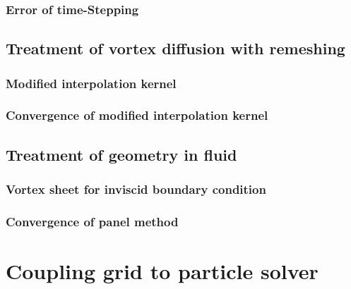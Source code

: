 \subsubsection{Error of time-Stepping}

\subsection{Treatment of vortex diffusion with remeshing}


\subsubsection{Modified interpolation kernel}

\subsubsection{Convergence of modified interpolation kernel}
% 

\subsection{Treatment of geometry in fluid}

\subsubsection{Vortex sheet for inviscid boundary condition}

\subsubsection{Convergence of panel method}


\section{Coupling grid to particle solver}


